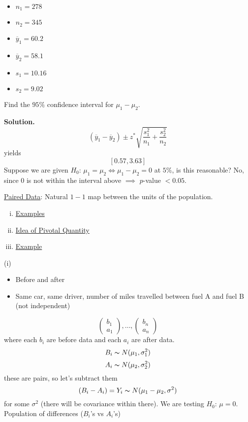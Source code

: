 \begin{exbox}
    \begin{example}\;
        \begin{itemize}
            \item $ n_1=278 $
            \item $ n_2=345 $
            \item $ \overline{y}_1=60.2 $
            \item $ \overline{y}_2=58.1 $
            \item $ s_1=10.16 $
            \item $ s_2=9.02 $
        \end{itemize}
        Find the $ 95\% $ confidence interval for $ \mu_1-\mu_2 $.

        \textbf{Solution.}
        \[ (\overline{y}_1-\overline{y}_2)\pm z^*\sqrt{\frac{s_1^2}{n_1}+\frac{s_2^2}{n_2}} \]
        yields
        \[ \left[ 0.57,3.63 \right] \]
        Suppose we are given $ H_0 $: $ \mu_1=\mu_2 \iff \mu_1-\mu_2=0 $ at $ 5\% $, is this reasonable? No,
        since $ 0 $ is not within the interval above $ \implies $ $ p $-value $ <0.05 $.
    \end{example}
\end{exbox}

\underline{Paired Data}: Natural $ 1-1 $ map between the units of the population.
\begin{enumerate}[(i)]
    \item \underline{Examples}
    \item \underline{Idea of Pivotal Quantity}
    \item \underline{Example}
\end{enumerate}
(i)
\begin{itemize}
    \item Before and after
    \item Same car, same driver, number of miles travelled between fuel A and fuel B (not independent)
\end{itemize}
\[ \begin{pmatrix}
        b_1 \\
        a_1
    \end{pmatrix},\ldots,
    \begin{pmatrix}
        b_n \\
        a_n
    \end{pmatrix} \]
where each $ b_i $ are before data and each $ a_i $ are after data.
\[ B_i \thicksim N(\mu_1,\sigma_1^2) \]
\[ A_i \thicksim N(\mu_2,\sigma_2^2) \]
these are pairs, so let's subtract them
\[ (B_i-A_i)=Y_i \thicksim N(\mu_1-\mu_2,\sigma^2) \]
for some $ \sigma^2 $ (there will be covariance within there).
We are testing $ H_0 $: $ \mu=0 $. Population of differences ($ B_i $'s vs $ A_i $'s)

